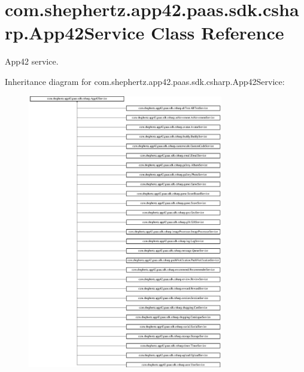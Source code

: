 \hypertarget{classcom_1_1shephertz_1_1app42_1_1paas_1_1sdk_1_1csharp_1_1_app42_service}{\section{com.\+shephertz.\+app42.\+paas.\+sdk.\+csharp.\+App42\+Service Class Reference}
\label{classcom_1_1shephertz_1_1app42_1_1paas_1_1sdk_1_1csharp_1_1_app42_service}
}


App42 service.  


Inheritance diagram for com.\+shephertz.\+app42.\+paas.\+sdk.\+csharp.\+App42\+Service\+:\begin{figure}[H]
\begin{center}
\leavevmode
\includegraphics[height=12.000000cm]{classcom_1_1shephertz_1_1app42_1_1paas_1_1sdk_1_1csharp_1_1_app42_service}
\end{center}
\end{figure}
